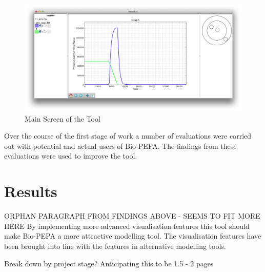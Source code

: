 \begin{figure}[h!]
    \centering
    \includegraphics[width=\textwidth]{images/french75_mac.png}
    \caption{Main Screen of the Tool}
    \label{fig:f75_mac_intro}
\end{figure}

Over the course of the first stage of work a number of evaluations were carried out with potential and actual users of Bio-PEPA.  The findings from these evaluations were used to improve the tool.

\section{Results}

ORPHAN PARAGRAPH FROM FINDINGS ABOVE - SEEMS TO FIT MORE HERE By implementing more advanced visualisation features this tool should make Bio-PEPA a more attractive modelling tool. The visualisation features have been brought into line with the features in alternative modelling tools.

Break down by project stage?  Anticipating this to be 1.5 - 2 pages

